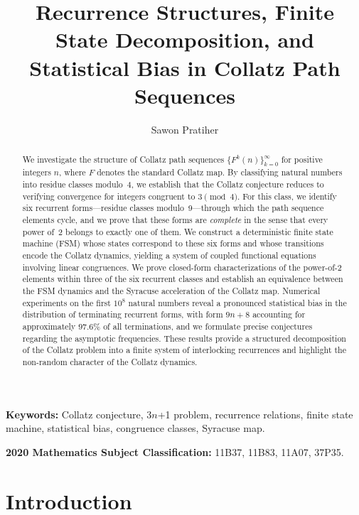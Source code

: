 \documentclass[11pt,a4paper]{article}
\title{\textbf{Recurrence Structures, Finite State Decomposition, and Statistical Bias in Collatz Path Sequences}}
\author{Sawon Pratiher}
\date{}
\theoremstyle{plain}
\theoremstyle{definition}
\begin{document}
\maketitle

\begin{abstract}
We investigate the structure of Collatz path sequences $\{F^k(n)\}_{k=0}^{\infty}$ for positive integers $n$, where $F$ denotes the standard Collatz map. By classifying natural numbers into residue classes modulo~4, we establish that the Collatz conjecture reduces to verifying convergence for integers congruent to $3 \pmod{4}$. For this class, we identify six recurrent forms---residue classes modulo~9---through which the path sequence elements cycle, and we prove that these forms are \emph{complete} in the sense that every power of~2 belongs to exactly one of them. We construct a deterministic finite state machine (FSM) whose states correspond to these six forms and whose transitions encode the Collatz dynamics, yielding a system of coupled functional equations involving linear congruences. We prove closed-form characterizations of the power-of-2 elements within three of the six recurrent classes and establish an equivalence between the FSM dynamics and the Syracuse acceleration of the Collatz map. Numerical experiments on the first $10^8$ natural numbers reveal a pronounced statistical bias in the distribution of terminating recurrent forms, with form $9n+8$ accounting for approximately $97.6\%$ of all terminations, and we formulate precise conjectures regarding the asymptotic frequencies. These results provide a structured decomposition of the Collatz problem into a finite system of interlocking recurrences and highlight the non-random character of the Collatz dynamics.
\end{abstract}

\medskip
\noindent\textbf{Keywords:} Collatz conjecture, 3$n$+1 problem, recurrence relations, finite state machine, statistical bias, congruence classes, Syracuse map.

\medskip
\noindent\textbf{2020 Mathematics Subject Classification:} 11B37, 11B83, 11A07, 37P35.

\section{Introduction}
\label{sec:intro}
\end{document}
